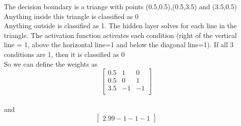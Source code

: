 \begin{answer}
The decision boundary is a triange with points (0.5,0.5),(0.5,3.5) and (3.5,0.5)\\
Anything inside this triangle is classified as 0\\
Anything outside is classified as 1. The hidden layer solves for each line in the triangle. The activation function activates each condition (right of the vertical line = 1, above the horizontal line=1 and below the diagonal line=1). If all 3 conditions are 1, then it is classified as 0\\
So we can define the weights as \\
\[
\begin{bmatrix}
0.5 & 1 & 0 \\
0.5 & 0 & 1 \\
3.5 & -1 & -1 \\
\end{bmatrix}
\]\\
and\\
\[
\begin{bmatrix}
2.99
-1
-1
-1
\end{bmatrix}
\]
 \end{answer}
